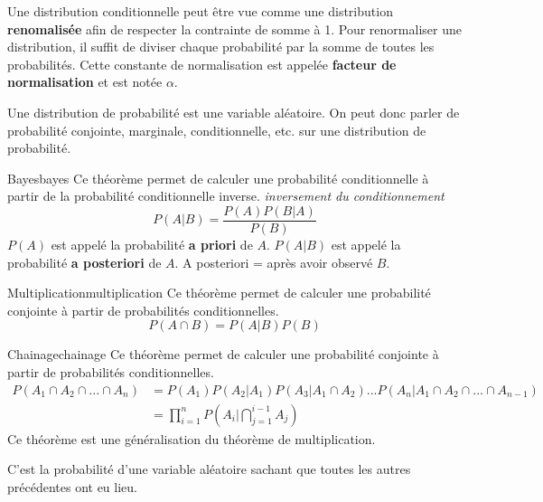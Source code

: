 Une distribution conditionnelle peut être vue comme une distribution \textbf{renomalisée} afin de 
respecter la contrainte de somme à 1.
Pour renormaliser une distribution, il suffit de diviser chaque probabilité par la somme de toutes les probabilités.
Cette constante de normalisation est appelée \textbf{facteur de normalisation} et est notée $\alpha$.

\begin{remark}
    Une distribution de probabilité est une variable aléatoire. 
    On peut donc parler de probabilité conjointe, marginale, conditionnelle, etc. 
    sur une distribution de probabilité. 
\end{remark}

\begin{theorem}{Bayes}{bayes}
    Ce théorème permet de calculer une probabilité conditionnelle à partir de la probabilité conditionnelle inverse. 
    \textit{inversement du conditionnement}
    \begin{equation}
        P(A|B) = \frac{P(A)P(B|A)}{P(B)}
    \end{equation}
    $P(A)$ est appelé la probabilité \textbf{a priori} de $A$. 
    $P(A|B)$ est appelé la probabilité \textbf{a posteriori} de $A$.
    A posteriori = après avoir observé $B$.
\end{theorem}

\begin{theorem}{Multiplication}{multiplication}
    Ce théorème permet de calculer une probabilité conjointe à partir de probabilités conditionnelles.
    \begin{equation}
        P(A\cap B) = P(A|B)P(B)
    \end{equation} 
\end{theorem}


\newpage


\begin{theorem}{Chainage}{chainage}
    Ce théorème permet de calculer une probabilité conjointe à partir de probabilités conditionnelles.
    \begin{align}
        P(A_1\cap A_2 \cap ... \cap A_n) &= P(A_1)P(A_2|A_1)P(A_3|A_1\cap A_2)...P(A_n|A_1\cap A_2 \cap ... \cap A_{n-1})\\
        &= \prod_{i=1}^{n} P(A_i|\bigcap_{j=1}^{i-1} A_j)
    \end{align}
    Ce théorème est une généralisation du théorème de multiplication.
\end{theorem}
\begin{remark}\leavevmode
    C'est la probabilité d'une variable aléatoire sachant que toutes les autres précédentes ont eu lieu.
\end{remark}


